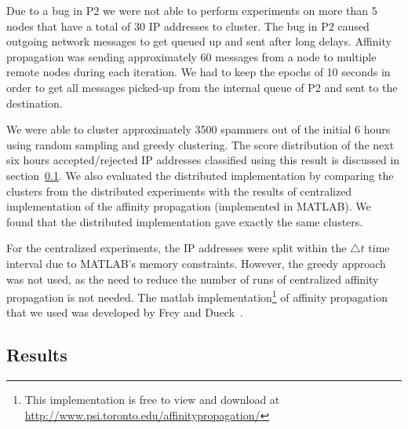 Due to a bug in P2 we were not able to perform experiments on more than 5 nodes that have a total of 30 IP addresses to cluster. The bug in P2 caused outgoing network messages to get queued up and sent after long delays. Affinity propagation was sending approximately 60 messages from a node to multiple remote nodes during each iteration. We had to keep the epochs of 10 seconds in order to get all messages picked-up from the internal queue of P2 and sent to the destination.

We were able to cluster approximately 3500 spammers out of the initial 6 hours using random sampling and greedy clustering. The score distribution of the next six hours accepted/rejected IP addresses classified using this result is discussed in section~\ref{sec:res}. We also evaluated the distributed implementation by comparing the clusters from the distributed experiments with the results of centralized implementation of the affinity propagation (implemented in MATLAB). We found that the distributed implementation gave exactly the same clusters. 

For the centralized experiments, the IP addresses were split within the \emph{$\bigtriangleup t$} time interval due to MATLAB's memory constraints. However, the greedy approach was not used, as the need to reduce the number of runs of centralized affinity propagation is not needed. The matlab implementation\footnote{This implementation is free to view and download at \url{http://www.psi.toronto.edu/affinitypropagation/}} of affinity propagation that we used was developed by Frey and Dueck~\cite{affinity}.

\subsection{Results}
\label{sec:res}

